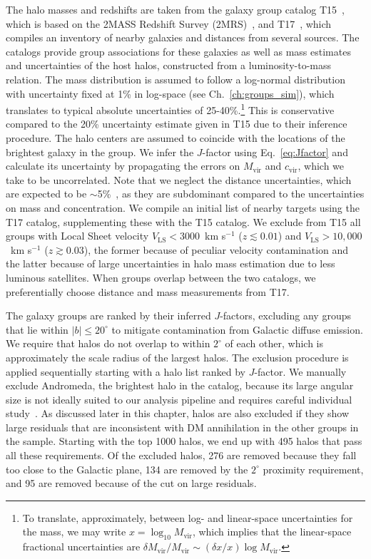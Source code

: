 The halo masses and redshifts are taken from the galaxy group catalog T15~\cite{Tully:2015opa}, which is based on the 2MASS Redshift Survey (2MRS)~\cite{Crook:2006sw}, and T17~\cite{2017ApJ...843...16K}, which compiles an inventory of nearby galaxies and distances from several sources.  The catalogs provide group associations for these galaxies as well as mass estimates and uncertainties of the host halos, constructed from a luminosity-to-mass relation. The mass distribution is assumed to follow a log-normal distribution with uncertainty fixed at 1\% in log-space (see Ch.~\ref{ch:groups_sim}), which translates to typical absolute uncertainties of 25-40\%.\footnote{To translate, approximately, between log- and linear-space uncertainties for the mass, we may write $x = \log_{10} M_\text{vir}$, which implies that the linear-space fractional uncertainties are $\delta M_\text{vir} / M_\text{vir} \sim (\delta x / x) \log M_\text{vir}$. } This is conservative compared to the 20\% uncertainty estimate given in T15 due to their inference procedure. The halo centers are assumed to coincide with the locations of the brightest galaxy in the group.  We infer the $J$-factor using Eq.~\ref{eq:Jfactor} and calculate its uncertainty by propagating the errors on $M_\text{vir}$ and $c_\text{vir}$, which we take to be uncorrelated.  Note that we neglect the distance uncertainties, which are expected to be $\sim$5\%~\cite{Tully:2016ppz,2017ApJ...843...16K}, as they are subdominant compared to the uncertainties on mass and concentration.  We compile an initial list of nearby targets using the T17 catalog, supplementing these with the T15 catalog.  We exclude from T15 all groups with Local Sheet velocity $V_\text{LS} < 3000$~km s$^{-1}$ ($z \lesssim 0.01$) and $V_\text{LS} > 10,000$~km s$^{-1}$ ($z \gtrsim 0.03$), the former because of peculiar velocity contamination and the latter because of large uncertainties in halo mass estimation due to less luminous satellites.  When groups overlap between the two catalogs, we preferentially choose distance and mass measurements from T17.

The galaxy groups are ranked by their inferred $J$-factors, excluding any groups that lie within $|b| \leq 20^\circ$ to mitigate contamination from Galactic diffuse emission.  We require that halos do not overlap to within $2^\circ$ of each other, which is approximately the scale radius of the largest halos.  The exclusion procedure is applied sequentially starting with a halo list ranked by $J$-factor.  We manually exclude Andromeda, the brightest halo in the catalog, because its large angular size is not ideally suited to our analysis pipeline and requires careful individual study~\cite{Ackermann:2017nya}.  
As discussed later in this chapter, halos are also excluded if they show large residuals that are inconsistent with DM annihilation in the other groups in the sample.  Starting with the top 1000 halos, we end up with 495 halos that pass all these requirements.  Of the excluded halos, 276 are removed because they fall too close to the Galactic plane, 134 are removed by the $2^\circ$ proximity requirement, and 95 are removed because of the cut on large residuals. 

